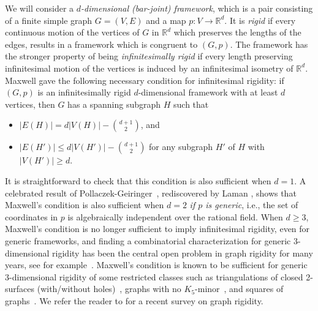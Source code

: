 \documentclass{daj}
\begin{document}
We will consider a {\em $d$-dimensional (bar-joint) framework},  which is a pair consisting of a finite simple graph $G=(V,E)$ and a map $p:V\rightarrow \mathbb{R}^d$. It is {\em rigid} if every continuous motion of the vertices  of $G$ in $\mathbb{R}^d$ which preserves the lengths of the edges,  results in a framework which is congruent to $(G,p)$. The framework has the stronger property of being {\em infinitesimally rigid} if every length preserving infinitesimal motion of the vertices is induced by an infinitesimal isometry of $\mathbb{R}^d$. 
Maxwell \cite{Max} gave the following necessary condition for
{infinitesimal rigidity}: if $(G,p)$ is an
infinitesimally rigid $d$-dimensional framework with at least $d$ vertices, then $G$ has a spanning subgraph $H$ such that
\begin{itemize}
\item $|E(H)|=d|V(H)|-{d+1\choose 2}$, and
\item $|E(H')|\leq d|V(H')|-{d+1\choose 2}$ for any subgraph $H'$ of $H$ with $|V(H')|\geq d$.
\end{itemize}
It is straightforward to  check that this condition is also sufficient when $d=1$.
A celebrated result of Pollaczek-Geiringer~\cite{P-G}, rediscovered by  Laman \cite{Lam}, shows that Maxwell's condition is also sufficient when $d=2$ {\em if $p$ is generic}, i.e., the set of coordinates in $p$ is algebraically independent over the rational field.
When $d\geq 3$, Maxwell's condition is no longer sufficient to imply infinitesimal rigidity, even for generic frameworks, and finding a combinatorial characterization for generic 3-dimensional rigidity  has been the central open problem in graph rigidity for many years, see for example~\cite{GSS93,Wsurvey}.
Maxwell's condition is known to be sufficient for generic 3-dimensional rigidity of some restricted classes such as triangulations of closed 2-surfaces (with/without holes)~\cite{CKT15,CKT18,F,FW}, graphs with no $K_5$-minor~\cite{N07}, and squares of  graphs~\cite{KT11}. We refer the reader to \cite{SW} for a recent survey on graph rigidity.
\end{document}
